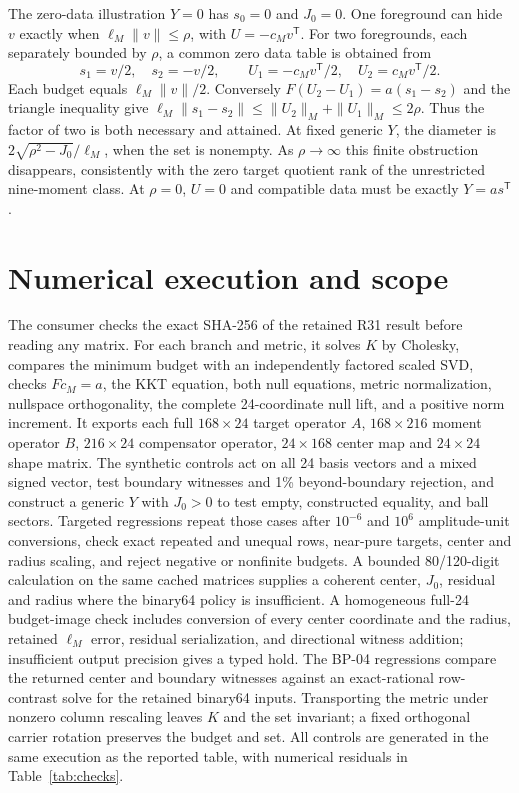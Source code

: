 \documentclass[aps,prd,onecolumn,11pt,nofootinbib,notitlepage]{revtex4-2}
\begin{document}
The zero-data illustration $Y=0$ has $s_0=0$ and $J_0=0$. One foreground can hide $v$ exactly when $\ell_M\|v\|\le\rho$, with $U=-c_Mv^{\mathsf T}$. For two foregrounds, each separately bounded by $\rho$, a common zero data table is obtained from
\begin{equation}
 s_1=v/2,\quad s_2=-v/2,\qquad
 U_1=-c_Mv^{\mathsf T}/2,\quad U_2=c_Mv^{\mathsf T}/2.
 \label{eq:pair}
\end{equation}
Each budget equals $\ell_M\|v\|/2$. Conversely $F(U_2-U_1)=a(s_1-s_2)$ and the triangle inequality give $\ell_M\|s_1-s_2\|\le\|U_2\|_M+\|U_1\|_M\le2\rho$. Thus the factor of two is both necessary and attained. At fixed generic $Y$, the diameter is $2\sqrt{\rho^2-J_0}/\ell_M$, when the set is nonempty. As $\rho\to\infty$ this finite obstruction disappears, consistently with the zero target quotient rank of the unrestricted nine-moment class. At $\rho=0$, $U=0$ and compatible data must be exactly $Y=a s^{\mathsf T}$.

\section{Numerical execution and scope}

The consumer checks the exact SHA-256 of the retained R31 result before reading any matrix. For each branch and metric, it solves $K$ by Cholesky, compares the minimum budget with an independently factored scaled SVD, checks $Fc_M=a$, the KKT equation, both null equations, metric normalization, nullspace orthogonality, the complete 24-coordinate null lift, and a positive norm increment. It exports each full $168\times24$ target operator $A$, $168\times216$ moment operator $B$, $216\times24$ compensator operator, $24\times168$ center map and $24\times24$ shape matrix. The synthetic controls act on all 24 basis vectors and a mixed signed vector, test boundary witnesses and 1\% beyond-boundary rejection, and construct a generic $Y$ with $J_0>0$ to test empty, constructed equality, and ball sectors. Targeted regressions repeat those cases after $10^{-6}$ and $10^6$ amplitude-unit conversions, check exact repeated and unequal rows, near-pure targets, center and radius scaling, and reject negative or nonfinite budgets. A bounded 80/120-digit calculation on the same cached matrices supplies a coherent center, $J_0$, residual and radius where the binary64 policy is insufficient. A homogeneous full-24 budget-image check includes conversion of every center coordinate and the radius, retained $\ell_M$ error, residual serialization, and directional witness addition; insufficient output precision gives a typed hold. The BP-04 regressions compare the returned center and boundary witnesses against an exact-rational row-contrast solve for the retained binary64 inputs. Transporting the metric under nonzero column rescaling leaves $K$ and the set invariant; a fixed orthogonal carrier rotation preserves the budget and set. All controls are generated in the same execution as the reported table, with numerical residuals in Table~\ref{tab:checks}.
\end{document}
